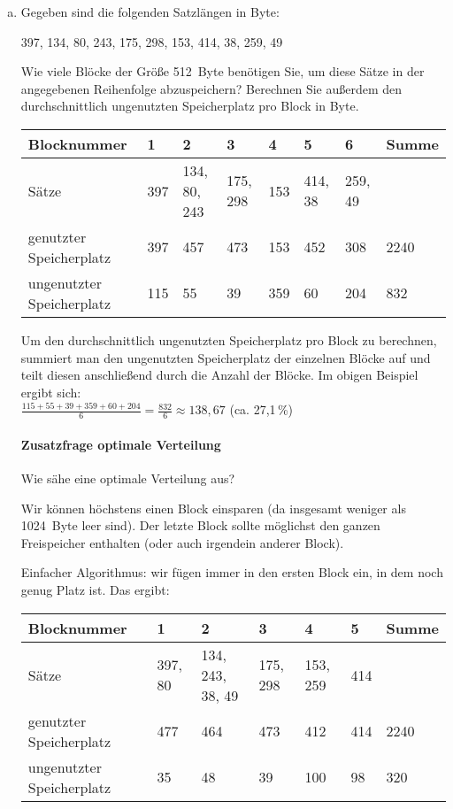 \begin{enumerate}[a)]
	\item Gegeben sind die folgenden Satzlängen in Byte:

	397, 134, 80, 243, 175, 298, 153, 414, 38, 259, 49

	Wie viele Blöcke der Größe 512~Byte benötigen Sie, um diese Sätze in der angegebenen Reihenfolge abzuspeichern? Berechnen Sie außerdem den durchschnittlich ungenutzten Speicherplatz pro Block in Byte.

	\begin{solution}
	\begin{tabular}{ | p{2.4cm} | p{1.1cm} | p{1.1cm} | p{1.1cm} | p{1.1cm} | p{1.1cm} | p{1.1cm} | p{1.3cm} | }
		\hline
		Blocknummer 						&	1 			& 		2 						& 		3					&		4 			& 		5 					& 		6 				& 	Summe	\\
		\hline
		Sätze 									&	397		&		134, 80, 243 	&		175, 298		&		153		&		414, 38		&		259, 49	&				\\
		\hline
		genutzter Speicherplatz 		& 	397 		& 		457 					& 		473 				& 		153 		&		452 				& 		308			& 	2240 	\\
		\hline
		ungenutzter Speicherplatz 	& 	115 		& 		55 					& 		39 				& 		359 		& 		60 				& 		204 			& 	832 		\\
		\hline
	\end{tabular}

	Um den durchschnittlich ungenutzten Speicherplatz pro Block zu berechnen, summiert man den ungenutzten Speicherplatz der einzelnen Blöcke auf und teilt diesen anschließend durch die Anzahl der Blöcke. Im obigen Beispiel ergibt sich:\\ $\frac{115+55+39+359+60+204}{6} = \frac{832}{6} \approx 138,67$ (ca. 27,1\,\%)


	\paragraph{Zusatzfrage optimale Verteilung}
	Wie sähe eine optimale Verteilung aus?

	Wir können höchstens einen Block einsparen (da insgesamt weniger als 1024~Byte leer sind). Der letzte Block sollte möglichst den ganzen Freispeicher enthalten (oder auch irgendein anderer Block).

	Einfacher Algorithmus: wir fügen immer in den ersten Block ein, in dem noch genug Platz ist. Das ergibt:

	\begin{tabular}{ | p{2.4cm} | p{1.1cm} | p{1.1cm} | p{1.1cm} | p{1.1cm} | p{1.1cm} | p{1.3cm} | }
		\hline
		Blocknummer						& 		1 				& 		2 							& 		3 					& 		4 					& 		5 			& 	Summe		\\
		\hline
		Sätze 									& 		397, 80 	& 		134, 243, 38, 49 	& 		175, 298 		&		153, 259		&		414  	& 					\\
		\hline
		genutzter Speicherplatz 		& 		477 			& 		464 						& 		473 				& 		412 				& 		414 		& 	2240 		\\
		\hline
		ungenutzter Speicherplatz 	& 		35 			& 		48 						& 		39 				& 		100 				& 		98 		& 	320			\\
		\hline
	\end{tabular}


\end{solution}
\end{enumerate}
